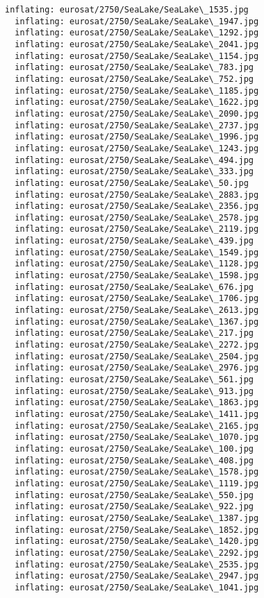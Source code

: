 \documentclass[11pt]{article}
\begin{document}
\begin{Verbatim}[commandchars=\\\{\}]
  inflating: eurosat/2750/SeaLake/SeaLake\_1535.jpg
  inflating: eurosat/2750/SeaLake/SeaLake\_1947.jpg
  inflating: eurosat/2750/SeaLake/SeaLake\_1292.jpg
  inflating: eurosat/2750/SeaLake/SeaLake\_2041.jpg
  inflating: eurosat/2750/SeaLake/SeaLake\_1154.jpg
  inflating: eurosat/2750/SeaLake/SeaLake\_783.jpg
  inflating: eurosat/2750/SeaLake/SeaLake\_752.jpg
  inflating: eurosat/2750/SeaLake/SeaLake\_1185.jpg
  inflating: eurosat/2750/SeaLake/SeaLake\_1622.jpg
  inflating: eurosat/2750/SeaLake/SeaLake\_2090.jpg
  inflating: eurosat/2750/SeaLake/SeaLake\_2737.jpg
  inflating: eurosat/2750/SeaLake/SeaLake\_1996.jpg
  inflating: eurosat/2750/SeaLake/SeaLake\_1243.jpg
  inflating: eurosat/2750/SeaLake/SeaLake\_494.jpg
  inflating: eurosat/2750/SeaLake/SeaLake\_333.jpg
  inflating: eurosat/2750/SeaLake/SeaLake\_50.jpg
  inflating: eurosat/2750/SeaLake/SeaLake\_2883.jpg
  inflating: eurosat/2750/SeaLake/SeaLake\_2356.jpg
  inflating: eurosat/2750/SeaLake/SeaLake\_2578.jpg
  inflating: eurosat/2750/SeaLake/SeaLake\_2119.jpg
  inflating: eurosat/2750/SeaLake/SeaLake\_439.jpg
  inflating: eurosat/2750/SeaLake/SeaLake\_1549.jpg
  inflating: eurosat/2750/SeaLake/SeaLake\_1128.jpg
  inflating: eurosat/2750/SeaLake/SeaLake\_1598.jpg
  inflating: eurosat/2750/SeaLake/SeaLake\_676.jpg
  inflating: eurosat/2750/SeaLake/SeaLake\_1706.jpg
  inflating: eurosat/2750/SeaLake/SeaLake\_2613.jpg
  inflating: eurosat/2750/SeaLake/SeaLake\_1367.jpg
  inflating: eurosat/2750/SeaLake/SeaLake\_217.jpg
  inflating: eurosat/2750/SeaLake/SeaLake\_2272.jpg
  inflating: eurosat/2750/SeaLake/SeaLake\_2504.jpg
  inflating: eurosat/2750/SeaLake/SeaLake\_2976.jpg
  inflating: eurosat/2750/SeaLake/SeaLake\_561.jpg
  inflating: eurosat/2750/SeaLake/SeaLake\_913.jpg
  inflating: eurosat/2750/SeaLake/SeaLake\_1863.jpg
  inflating: eurosat/2750/SeaLake/SeaLake\_1411.jpg
  inflating: eurosat/2750/SeaLake/SeaLake\_2165.jpg
  inflating: eurosat/2750/SeaLake/SeaLake\_1070.jpg
  inflating: eurosat/2750/SeaLake/SeaLake\_100.jpg
  inflating: eurosat/2750/SeaLake/SeaLake\_408.jpg
  inflating: eurosat/2750/SeaLake/SeaLake\_1578.jpg
  inflating: eurosat/2750/SeaLake/SeaLake\_1119.jpg
  inflating: eurosat/2750/SeaLake/SeaLake\_550.jpg
  inflating: eurosat/2750/SeaLake/SeaLake\_922.jpg
  inflating: eurosat/2750/SeaLake/SeaLake\_1387.jpg
  inflating: eurosat/2750/SeaLake/SeaLake\_1852.jpg
  inflating: eurosat/2750/SeaLake/SeaLake\_1420.jpg
  inflating: eurosat/2750/SeaLake/SeaLake\_2292.jpg
  inflating: eurosat/2750/SeaLake/SeaLake\_2535.jpg
  inflating: eurosat/2750/SeaLake/SeaLake\_2947.jpg
  inflating: eurosat/2750/SeaLake/SeaLake\_1041.jpg

\end{Verbatim}
\end{document}
